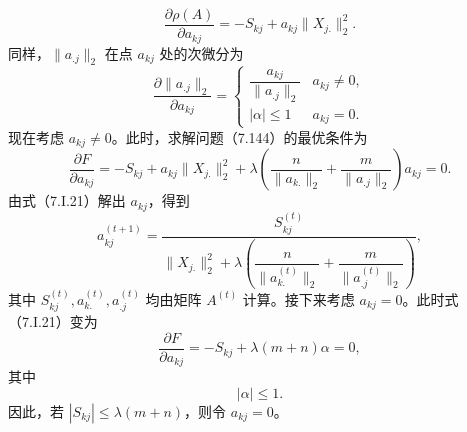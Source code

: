 \begin{equation}
\frac{\partial\rho(A)}{\partial a_{kj}}=-S_{kj}+a_{kj}\|X_{j.}\|_2^2.\tag{7.I.19}
\end{equation}
同样，$\|a_{.j}\|_2$ 在点 $a_{kj}$ 处的次微分为
\begin{equation}
\frac{\partial\|a_{.j}\|_2}{\partial a_{kj}}
 =\begin{cases}
\dfrac{a_{kj}}{\|a_{.j}\|_2}&a_{kj}\ne0,\\
|\alpha|\le1&a_{kj}=0.
\end{cases}\tag{7.I.20}
\end{equation}
现在考虑 $a_{kj}\ne0$。此时，求解问题（7.144）的最优条件为
\begin{equation}
\frac{\partial F}{\partial a_{kj}}
 =-S_{kj}+a_{kj}\|X_{j.}\|_2^2
 +\lambda\left(\frac n{\|a_{k.}\|_2}+\frac m{\|a_{.j}\|_2}\right)a_{kj}=0.\tag{7.I.21}
\end{equation}
由式（7.I.21）解出 $a_{kj}$，得到
\begin{equation}
a_{kj}^{(t+1)}=\frac{S_{kj}^{(t)}}
 {\|X_{j.}\|_2^2+\lambda\left(\dfrac n{\|a_{k.}^{(t)}\|_2}
 +\dfrac m{\|a_{.j}^{(t)}\|_2}\right)},\tag{7.I.22}
\end{equation}
其中 $S_{kj}^{(t)},a_{k.}^{(t)},a_{.j}^{(t)}$ 均由矩阵 $A^{(t)}$ 计算。接下来考虑 $a_{kj}=0$。此时式（7.I.21）变为
\begin{equation}
\frac{\partial F}{\partial a_{kj}}=-S_{kj}+\lambda(m+n)\alpha=0,\tag{7.I.23}
\end{equation}
其中
\[
|\alpha|\le1.
\]
因此，若 $|S_{kj}|\le\lambda(m+n)$，则令 $a_{kj}=0$。

